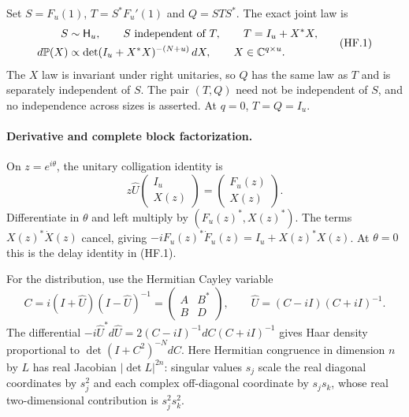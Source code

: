 Set $S=F_u(1)$, $T=S^*F_u'(1)$ and $Q=STS^*$.
The exact joint law is
\[
 \begin{aligned}
 S&\sim\mathsf H_u,\qquad S\ \hbox{independent of }T,\qquad
 T=I_u+X^*X,\\
 d\mathbb P(X)&\propto\det(I_u+X^*X)^{-(N+u)}\,dX,\qquad
 X\in\mathbb C^{q\times u}.
 \end{aligned}                                           \tag{HF.1}
\]
The $X$ law is invariant under right unitaries, so $Q$ has the same law
as $T$ and is separately independent of $S$. The pair $(T,Q)$ need not
be independent of $S$, and no independence across sizes is asserted.
At $q=0$, $T=Q=I_u$.

\paragraph{Derivative and complete block factorization.}
On $z=e^{i\theta}$, the unitary colligation identity is
\[
 z\widehat U\begin{pmatrix}I_u\\X(z)\end{pmatrix}
       =\begin{pmatrix}F_u(z)\\X(z)\end{pmatrix}.
\]
Differentiate in $\theta$ and left multiply by $(F_u(z)^*,X(z)^*)$.
The terms $X(z)^*\dot X(z)$ cancel, giving
$-iF_u(z)^*\dot F_u(z)=I_u+X(z)^*X(z)$. At $\theta=0$ this is the
delay identity in (HF.1).

For the distribution, use the Hermitian Cayley variable
\[
 C=i(I+\widehat U)(I-\widehat U)^{-1}
      =\begin{pmatrix}A&B^*\\B&D\end{pmatrix},\qquad
 \widehat U=(C-iI)(C+iI)^{-1}.
\]
The differential
$-i\widehat U^*d\widehat U=2(C-iI)^{-1}dC(C+iI)^{-1}$ gives Haar
density proportional to $\det(I+C^2)^{-N}dC$. Here Hermitian
congruence in dimension $n$ by $L$ has real Jacobian
$|\det L|^{2n}$: singular values $s_j$ scale the real diagonal
coordinates by $s_j^2$ and each complex off-diagonal coordinate by
$s_js_k$, whose real two-dimensional contribution is $s_j^2s_k^2$.


